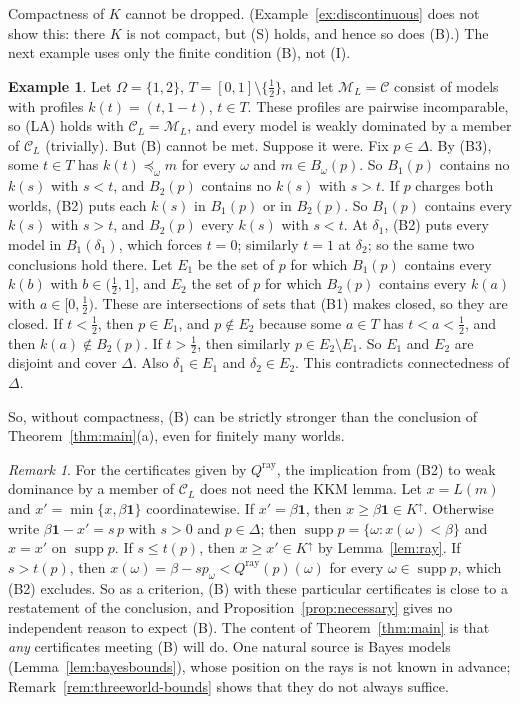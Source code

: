 \documentclass[11pt]{article}
\theoremstyle{definition}
\newtheorem{example}[theorem]{Example}
\theoremstyle{remark}
\newtheorem{remark}[theorem]{Remark}
\newcommand{\M}{\mathcal M}
\newcommand{\C}{\mathcal C}
\newcommand{\one}{\mathbf 1}
\newcommand{\supp}{\operatorname{supp}}
\begin{document}
Compactness of $K$ cannot be dropped. (Example~\ref{ex:discontinuous} does not show this: there $K$ is not compact, but (S) holds, and hence so does (B).) The next example uses only the finite condition (B), not (I).
\begin{example}\label{ex:hole}
Let $\Omega=\{1,2\}$, $T=[0,1]\setminus\{\tfrac12\}$, and let $\M_L=\C$ consist of models with profiles $k(t)=(t,1-t)$, $t\in T$. These profiles are pairwise incomparable, so (LA) holds with $\C_L=\M_L$, and every model is weakly dominated by a member of $\C_L$ (trivially). But (B) cannot be met. Suppose it were. Fix $p\in\Delta$. By (B3), some $t\in T$ has $k(t)\preceq_\omega m$ for every $\omega$ and $m\in B_\omega(p)$. So $B_1(p)$ contains no $k(s)$ with $s<t$, and $B_2(p)$ contains no $k(s)$ with $s>t$. If $p$ charges both worlds, (B2) puts each $k(s)$ in $B_1(p)$ or in $B_2(p)$. So $B_1(p)$ contains every $k(s)$ with $s>t$, and $B_2(p)$ every $k(s)$ with $s<t$. At $\delta_1$, (B2) puts every model in $B_1(\delta_1)$, which forces $t=0$; similarly $t=1$ at $\delta_2$; so the same two conclusions hold there. Let $E_1$ be the set of $p$ for which $B_1(p)$ contains every $k(b)$ with $b\in(\tfrac12,1]$, and $E_2$ the set of $p$ for which $B_2(p)$ contains every $k(a)$ with $a\in[0,\tfrac12)$. These are intersections of sets that (B1) makes closed, so they are closed. If $t<\tfrac12$, then $p\in E_1$, and $p\notin E_2$ because some $a\in T$ has $t<a<\tfrac12$, and then $k(a)\notin B_2(p)$. If $t>\tfrac12$, then similarly $p\in E_2\setminus E_1$. So $E_1$ and $E_2$ are disjoint and cover $\Delta$. Also $\delta_1\in E_1$ and $\delta_2\in E_2$. This contradicts connectedness of $\Delta$.
\end{example}
So, without compactness, (B) can be strictly stronger than the conclusion of Theorem~\ref{thm:main}(a), even for finitely many worlds.

\begin{remark}\label{rem:elementary}
For the certificates given by $Q^{\mathrm{ray}}$, the implication from (B2) to weak dominance by a member of $\C_L$ does not need the KKM lemma. Let $x=L(m)$ and $x'=\min\{x,\beta\one\}$ coordinatewise. If $x'=\beta\one$, then $x\ge \beta\one\in K^\uparrow$. Otherwise write $\beta\one-x'=s\,p$ with $s>0$ and $p\in\Delta$; then $\supp p=\{\omega:x(\omega)<\beta\}$ and $x=x'$ on $\supp p$. If $s\le t(p)$, then $x\ge x'\in K^\uparrow$ by Lemma~\ref{lem:ray}. If $s>t(p)$, then $x(\omega)=\beta-sp_\omega<Q^{\mathrm{ray}}(p)(\omega)$ for every $\omega\in\supp p$, which (B2) excludes. So as a criterion, (B) with these particular certificates is close to a restatement of the conclusion, and Proposition~\ref{prop:necessary} gives no independent reason to expect (B). The content of Theorem~\ref{thm:main} is that \emph{any} certificates meeting (B) will do. One natural source is Bayes models (Lemma~\ref{lem:bayesbounds}), whose position on the rays is not known in advance; Remark~\ref{rem:threeworld-bounds} shows that they do not always suffice.
\end{remark}
\end{document}
